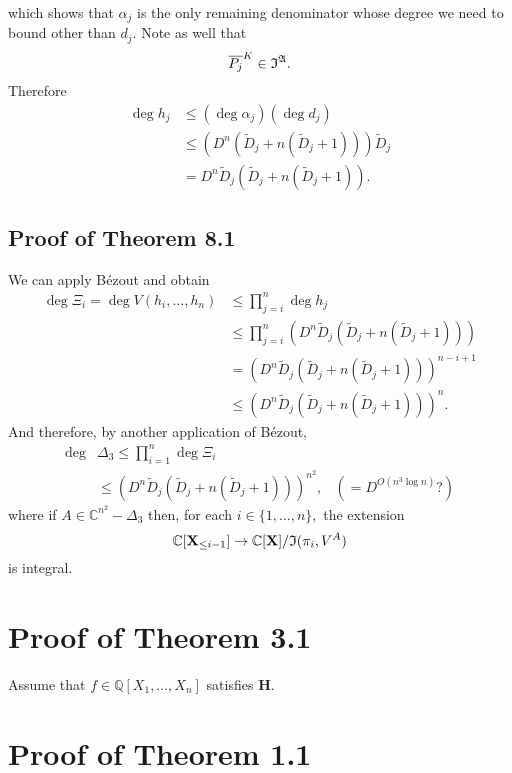 \documentclass[sigconf]{acmart}
\def\pjb{\overline{P_{j}}}
\def\C{\mathbb{C}}
\def\Q{\mathbb{Q}}
\def\Dt{\widetilde{D}}
\def\I{\frak{I}}
\def\A{\frak{A}}
\begin{document}
%
which shows that $\alpha_j$ is the only remaining denominator whose degree we need to bound other than $d_j$. Note as well that
\[
\pjb^K \in \I^{\A}.
\]
Therefore 
%
\begin{align*}
\deg h_j &\leq \left(\deg \alpha_j\right)\left(\deg d_j\right)\\
    &\leq \left(D^n\left(\Dt_j + n\left(\Dt_j+1\right) \right)\right)\Dt_j\\
    &=D^n\Dt_j\left(\Dt_j + n\left(\Dt_j+1\right) \right).
\end{align*}
%
\subsection{Proof of Theorem 8.1}
%
We can apply B\'ezout and obtain
%
\begin{align*}
    \deg \Xi_i = \deg V(h_i,\hdots,h_n)
    &\leq \prod_{j=i}^n \deg h_j\\
    &\leq  \prod_{j=i}^n \left( D^n\Dt_j\left(\Dt_j + n\left(\Dt_j+1\right) \right) \right) \\
    &=  \left( D^n\Dt_j\left(\Dt_j + n\left(\Dt_j+1\right) \right) \right)^{n-i+1}\\
    &\leq  \left( D^n\Dt_j\left(\Dt_j + n\left(\Dt_j+1\right) \right) \right)^{n}.
\end{align*}
%
And therefore, by another application of B\'ezout, 
%
\begin{align*}
    \deg& \Delta_3 \leq \prod_{i=1}^n \deg \Xi_i\\
    &\leq \left( D^n\Dt_j\left(\Dt_j + n\left(\Dt_j+1\right) \right) \right)^{n^2},
    &(=D^{O(n^3 \log n)}\textrm{?})
\end{align*}
%
where if $A \in \C^{n^2} - \Delta_3$ then, for each $i \in \{1,\hdots,n\},$ the extension 
\[
\C[\textbf{X}_{\leq i-1}]\rightarrow\C[\textbf{X}]/\frak{I}(\pi_i,V^A)
\]
is integral.
%
%
%
%
\section{Proof of Theorem 3.1}
%
Assume that $f\in \Q[X_1,\hdots,X_n]$ satisfies $\textbf{H}.$
%
%
%
%
\section{Proof of Theorem 1.1}
%
%






\end{document}
